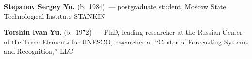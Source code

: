 \begin{multicols}{2}
\vspace*{3pt}

\noindent
\textbf{Stepanov Sergey Yu.} (b.\ 1984)~---  postgraduate student,
Moscow State Technological Institute STANKIN

\vspace*{3pt}

\noindent
\textbf{Torshin Ivan Yu.} (b.\ 1972)~--- PhD, leading researcher at the Russian Center of the 
Trace Elements for \mbox{UNESCO}, researcher at ``Center of Forecasting Systems and Recognition,'' LLC


\end{multicols}